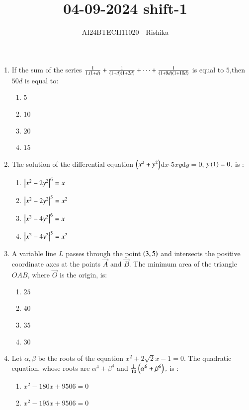 \documentclass[journal,12pt,onecolumn]{IEEEtran}
\theoremstyle{remark}
\begin{document}

\vspace{3cm}

\title{04-09-2024 shift-1}
\author{AI24BTECH11020 - Rishika}
\maketitle
\bigskip
\renewcommand{\thefigure}{\theenumi}
\renewcommand{\thetable}{\theenumi}
\begin{enumerate}

	\item If the sum of the series $\frac{1}{1.\left(1+d\right)}+\frac{1}{\left(1+d\right)\left(1+2d\right)}+\cdots+\frac{1}{\left(1+9d\right)\left(1+10d\right)}$ is equal to $5$,then $50d$ is equal to:   
     \begin{enumerate}
     \item $5$ \item $10$ \item $20$ \item $15$
     \end{enumerate}
\item The solution of the differential equation $\left(x^2+y^2\right)$d$x$-$5xy$d$y=0$, $y\left(1\right)=0,$ is :
      \begin{enumerate}
      \item $\left\vert x^2-2y^2\right\vert^6=x$
      \item $\left\vert x^2-2y^2\right\vert^5=x^2$
      \item $\left\vert x^2-4y^2\right\vert^6=x$
      \item $\left\vert x^2-4y^2\right\vert^5=x^2$
      \end{enumerate}
\item A variable line $L$ passes through the point $\left(3,5\right)$ and intersects the positive coordinate axes at the points $\vec{A}$ and $\vec{B}$. The minimum area of the triangle $OAB$, where $\vec{O}$ is the origin, is:
     \begin{enumerate}
     \item $25$ \item $40$ \item $35$ \item $30$
     \end{enumerate}
\item Let $\alpha ,\beta $ be the roots of the equation $x^2+2\sqrt{2}x-1=0.$ The quadratic equation, whose roots are $\alpha^4+\beta^4$ and $\frac{1}{10}\left(\alpha^6+\beta^6\right),$ is :
     \begin{enumerate}
     \item $x^2-180x+9506=0$
     \item $x^2-195x+9506=0$

\end{enumerate}
\end{enumerate}
\end{document}
